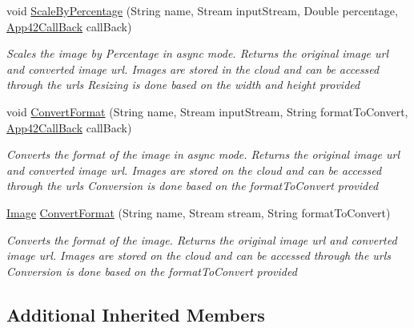 \begin{DoxyCompactItemize}
void \hyperlink{classcom_1_1shephertz_1_1app42_1_1paas_1_1sdk_1_1csharp_1_1image_processor_1_1_image_processor_service_af7138540c43fae2d815f66edca3be548}{Scale\+By\+Percentage} (String name, Stream input\+Stream, Double percentage, \hyperlink{interfacecom_1_1shephertz_1_1app42_1_1paas_1_1sdk_1_1csharp_1_1_app42_call_back}{App42\+Call\+Back} call\+Back)
\begin{DoxyCompactList}\small\item\em Scales the image by Percentage in async mode. Returns the original image url and converted image url. Images are stored in the cloud and can be accessed through the urls Resizing is done based on the width and height provided \end{DoxyCompactList}\item 
void \hyperlink{classcom_1_1shephertz_1_1app42_1_1paas_1_1sdk_1_1csharp_1_1image_processor_1_1_image_processor_service_a9bed5310bf6aed7857d5304b63f1231b}{Convert\+Format} (String name, Stream input\+Stream, String format\+To\+Convert, \hyperlink{interfacecom_1_1shephertz_1_1app42_1_1paas_1_1sdk_1_1csharp_1_1_app42_call_back}{App42\+Call\+Back} call\+Back)
\begin{DoxyCompactList}\small\item\em Converts the format of the image in async mode. Returns the original image url and converted image url. Images are stored on the cloud and can be accessed through the urls Conversion is done based on the format\+To\+Convert provided \end{DoxyCompactList}\item 
\hyperlink{classcom_1_1shephertz_1_1app42_1_1paas_1_1sdk_1_1csharp_1_1image_processor_1_1_image}{Image} \hyperlink{classcom_1_1shephertz_1_1app42_1_1paas_1_1sdk_1_1csharp_1_1image_processor_1_1_image_processor_service_a2ecbbef06d20e98af2be9836574d463b}{Convert\+Format} (String name, Stream stream, String format\+To\+Convert)
\begin{DoxyCompactList}\small\item\em Converts the format of the image. Returns the original image url and converted image url. Images are stored on the cloud and can be accessed through the urls Conversion is done based on the format\+To\+Convert provided \end{DoxyCompactList}\end{DoxyCompactItemize}
\subsection*{Additional Inherited Members}


